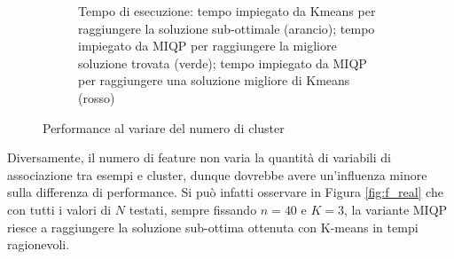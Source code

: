 \documentclass{article}
\begin{document}
\begin{figure}[H]
\begin{subfigure}[t]{0.49\linewidth}
         \caption{Tempo di esecuzione: tempo impiegato da Kmeans per raggiungere la soluzione sub-ottimale (arancio); tempo impiegato da MIQP per raggiungere la migliore soluzione trovata (verde); tempo impiegato da MIQP per raggiungere una soluzione migliore di Kmeans (rosso)}
     \end{subfigure}
        \caption{Performance al variare del numero di cluster}
        \label{fig:k_real}
     \end{figure}
    Diversamente, il numero di feature non varia la quantità di variabili di associazione tra esempi e cluster, dunque dovrebbe avere un'influenza minore sulla differenza di performance. Si può infatti osservare in Figura \ref{fig:f_real} che con tutti i valori di $N$ testati, sempre fissando $n=40$ e $K=3$, la variante MIQP riesce a raggiungere la soluzione sub-ottima ottenuta con K-means in tempi ragionevoli.
\end{document}
